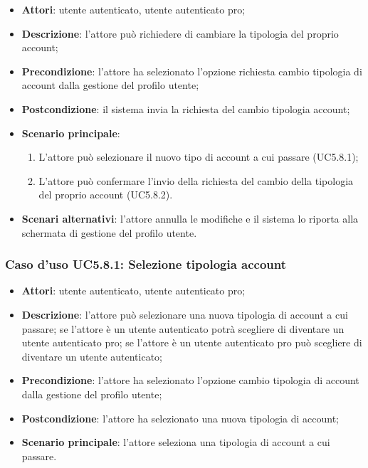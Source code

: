 \begin{itemize}
	\item \textbf{Attori}: utente autenticato, utente autenticato pro;
	\item \textbf{Descrizione}: l'attore può richiedere di cambiare la tipologia del proprio account; 
	\item \textbf{Precondizione}:  l'attore ha selezionato l'opzione richiesta cambio tipologia di account dalla gestione del profilo utente;
	\item \textbf{Postcondizione}: il sistema invia la richiesta del cambio tipologia account;
	\item \textbf{Scenario principale}:
	\begin{enumerate}
		\item L'attore può selezionare il nuovo tipo di account a cui passare (UC5.8.1);
		\item L'attore può confermare l'invio della richiesta del cambio della tipologia del proprio account (UC5.8.2).
	\end{enumerate}
	\item \textbf{Scenari alternativi}: l'attore annulla le modifiche e il sistema lo riporta alla schermata di gestione del profilo utente.
\end{itemize}

\subsubsection{Caso d'uso UC5.8.1: Selezione tipologia account}

\begin{itemize}
	\item \textbf{Attori}: utente autenticato, utente autenticato pro;
	\item \textbf{Descrizione}: l'attore può selezionare una nuova tipologia di account a cui passare; se l'attore è un utente autenticato potrà scegliere di diventare un utente autenticato pro; se l'attore è un utente autenticato pro può scegliere di diventare un utente autenticato;
	\item \textbf{Precondizione}: l'attore ha selezionato l'opzione cambio tipologia di account dalla gestione del profilo utente;
	\item \textbf{Postcondizione}: l'attore ha selezionato  una nuova tipologia di account;
	\item \textbf{Scenario principale}: l'attore seleziona una tipologia di account a cui passare.
\end{itemize}

